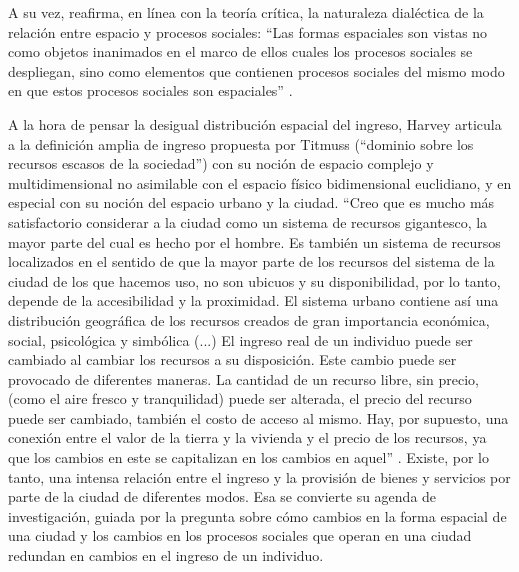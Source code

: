 A su vez, reafirma, en línea con la teoría crítica, la naturaleza dialéctica de la relación entre espacio y procesos sociales:  “Las formas espaciales son vistas no como objetos inanimados en el marco de ellos cuales los procesos sociales se despliegan, sino como elementos que contienen procesos sociales del mismo modo en que estos procesos sociales son espaciales” \cite[~3]{harvey}.

A la hora de pensar la desigual distribución espacial del ingreso, Harvey articula a la definición amplia de ingreso propuesta por Titmuss (“dominio sobre los recursos escasos de la sociedad”) con su noción de espacio complejo y multidimensional no asimilable con el espacio físico bidimensional euclidiano, y en especial con su noción del espacio urbano y la ciudad. “Creo que es mucho más satisfactorio considerar a la ciudad como un sistema de recursos gigantesco, la mayor parte del cual es hecho por el hombre. Es también un sistema de recursos localizados en el sentido de que la mayor parte de los recursos del sistema de la ciudad de los que hacemos uso, no son ubicuos y su disponibilidad, por lo tanto, depende de la accesibilidad y la proximidad. El sistema urbano contiene así una distribución geográfica de los recursos creados de gran importancia económica, social, psicológica y simbólica (...) El ingreso real de un individuo puede ser cambiado al cambiar los recursos a su disposición. Este cambio puede ser provocado de diferentes maneras. La cantidad de un recurso libre, sin precio, (como el aire fresco y tranquilidad) puede ser alterada, el precio del recurso puede ser cambiado, también el costo de acceso al mismo. Hay, por supuesto, una conexión entre el valor de la tierra y la vivienda y el precio de los recursos, ya que los cambios en este se capitalizan en los cambios en aquel” \cite[p.~68]{harvey}. Existe, por lo tanto, una intensa relación entre el ingreso y la provisión de bienes y servicios por parte de la ciudad de diferentes modos. Esa se convierte su agenda de investigación, guiada por la pregunta sobre cómo cambios en la forma espacial de una ciudad y los cambios en los procesos sociales que operan en una ciudad redundan en cambios en el ingreso de un individuo. 

